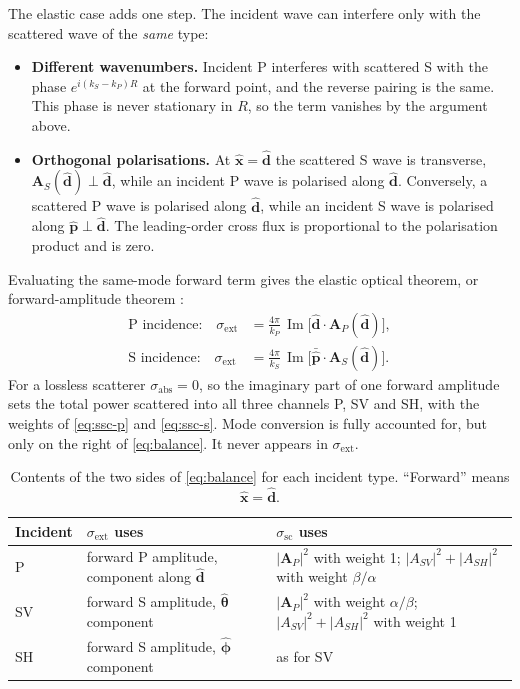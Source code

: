 \documentclass[11pt,a4paper]{article}
\newcommand{\bA}{\mathbf{A}}
\newcommand{\bd}{\hat{\mathbf{d}}}
\newcommand{\bp}{\hat{\mathbf{p}}}
\newcommand{\xh}{\hat{\mathbf{x}}}
\newcommand{\thh}{\hat{\boldsymbol{\theta}}}
\newcommand{\phh}{\hat{\boldsymbol{\phi}}}
\newcommand{\sext}{\sigma_{\mathrm{ext}}}
\newcommand{\ssc}{\sigma_{\mathrm{sc}}}
\newcommand{\sabs}{\sigma_{\mathrm{abs}}}
\newcommand{\kp}{k_{P}}
\newcommand{\ks}{k_{S}}
\DeclareMathOperator{\Imag}{Im}
\begin{document}
The elastic case adds one step. The incident wave can interfere only
with the scattered wave of the \emph{same} type:
\begin{itemize}
\item \textbf{Different wavenumbers.} Incident P interferes with
  scattered S with the phase $e^{i(\ks - \kp)R}$ at the forward point,
  and the reverse pairing is the same. This phase is never stationary in
  $R$, so the term vanishes by the argument above.
\item \textbf{Orthogonal polarisations.} At $\xh = \bd$ the scattered S
  wave is transverse, $\bA_S(\bd)\perp\bd$, while an incident P wave is
  polarised along $\bd$. Conversely, a scattered P wave is polarised
  along $\bd$, while an incident S wave is polarised along $\bp\perp\bd$.
  The leading-order cross flux is proportional to the polarisation
  product and is zero.
\end{itemize}
Evaluating the same-mode forward term gives the elastic optical theorem,
or forward-amplitude theorem \citep{Varatharajulu1977}:
\begin{align}
  \text{P incidence:}\quad
  \sext &= \frac{4\pi}{\kp}\,
           \Imag\bigl[\bd\cdot\bA_P(\bd)\bigr],
  \label{eq:ot-p}\\
  \text{S incidence:}\quad
  \sext &= \frac{4\pi}{\ks}\,
           \Imag\bigl[\bar{\bp}\cdot\bA_S(\bd)\bigr].
  \label{eq:ot-s}
\end{align}
For a lossless scatterer $\sabs = 0$, so the imaginary part of one
forward amplitude sets the total power scattered into all three
channels P, SV and SH, with the weights of \eqref{eq:ssc-p} and
\eqref{eq:ssc-s}. Mode conversion is fully accounted for, but only on
the right of \eqref{eq:balance}. It never appears in $\sext$.

\begin{table}[h]
\centering
\caption{Contents of the two sides of \eqref{eq:balance} for each
incident type. ``Forward'' means $\xh = \bd$.}
\label{tab:summary}
\begin{tabular}{l >{\raggedright}p{} >{\raggedright\arraybackslash}p{}}
\toprule
Incident & $\sext$ uses & $\ssc$ uses \\
\midrule
P & forward P amplitude, component along $\bd$
  & $|\bA_P|^2$ with weight 1; $|A_{SV}|^2 + |A_{SH}|^2$ with weight $\beta/\alpha$ \\[0.3em]
SV & forward S amplitude, $\thh$ component
  & $|\bA_P|^2$ with weight $\alpha/\beta$; $|A_{SV}|^2 + |A_{SH}|^2$ with weight 1 \\[0.3em]
SH & forward S amplitude, $\phh$ component
  & as for SV \\
\bottomrule
\end{tabular}
\end{table}
\end{document}
